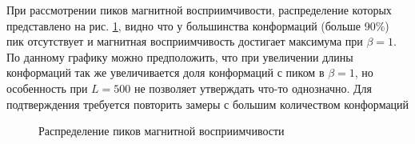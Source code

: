 При рассмотрении пиков магнитной восприимчивости, распределение которых представлено на рис. \ref{fig:MS_peaks_distr}, видно что у большинства конформаций (больше 90\%) пик отсутствует и магнитная восприимчивость достигает максимума при $\beta = 1$. По данному графику можно предположить, что при увеличении длины конформаций так же увеличивается доля конформаций с пиком в $\beta = 1$, но особенность при $L=500$ не позволяет утверждать что-то однозначно. Для подтверждения требуется повторить замеры с большим количеством конформаций


\begin{figure}[ht]
	\centering
	
	\caption{Распределение пиков магнитной восприимчивости}
	\label{fig:MS_peaks_distr}
\end{figure}